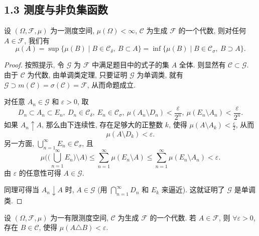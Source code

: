     \subsection{1.3 测度与非负集函数}
        \begin{3}
            设 $(\Omega,\mathcal{F},\mu)$ 为一测度空间, 
            $\mu(\Omega)<\infty$, 
            $\mathcal{C}$ 为生成 $\mathcal{F}$ 的一个代数, 
            则对任何 $A\in\mathcal{F}$, 我们有
            \[
                \mu(A)=\sup\{\mu(B)\mid B\in\mathcal{C}_{\delta},\ B\subset A\}=\inf\{\mu(B)\mid B\in\mathcal{C}_{\sigma},\ B\supset A\}.
            \]
        \end{3}
        \begin{proof}
            按照提示, 令 $\mathcal{G}$ 为 $\mathcal{F}$ 中满足题目中的式子的集 $A$ 全体. 
            则显然有 $\mathcal{C}\subset\mathcal{G}$. 
            由于 $\mathcal{C}$ 为代数, 
            由单调类定理, 
            只要证明 $\mathcal{G}$ 为单调类, 
            就有 $\mathcal{G}\supset m(\mathcal{C})=\sigma(\mathcal{C})=\mathcal{F}$, 
            从而命题成立.

            对任意 $A_n\in\mathcal{G}$ 和 $\varepsilon>0$, 取
            \[
                D_n\subset A_n\subset E_n,\ 
                D_n\in\mathcal{C}_\delta,\ 
                E_n\in\mathcal{C}_\sigma,\ 
                \mu(A_n\setminus D_n)<\frac{\varepsilon}{2^n},\  
                \mu(E_n\setminus A_n)<\frac{\varepsilon}{2^n}.
            \]
            如果 $A_n\uparrow A$, 
            那么由下连续性, 
            存在足够大的正整数 $k$, 
            使得 $\mu(A\setminus A_k)<\displaystyle\frac{\varepsilon}{2}$,  从而
            \[
                \mu(A\setminus D_k)<\varepsilon.
            \]
            另一方面, $\displaystyle\bigcup_{n=1}^\infty E_n\in\mathcal{C}_{\sigma}$, 且
            \[
                \mu\biggl(\big(\bigcup_{n=1}^\infty E_n\big)\setminus A\biggr)\leqslant\sum_{n=1}^\infty \mu(E_n\setminus A)\leqslant\sum_{n=1}^\infty\mu(E_n\setminus A_n)<\varepsilon.
            \]
            由 $\varepsilon$ 的任意性可得 $A\in\mathcal{G}$.

            同理可得当 $A_n\downarrow A$ 时, 
            $A\in\mathcal{G}$ (用 $\displaystyle\bigcap_{n=1}^\infty D_n$ 和 $E_k$ 来逼近). 
            这就证明了 $\mathcal{G}$ 是单调类.
        \end{proof}
        \begin{4}
            设 $(\Omega,\mathcal{F},\mu)$ 为一有限测度空间, 
            $\mathcal{C}$ 为生成 $\mathcal{F}$ 的一个代数. 
            若 $A\in\mathcal{F}$, 
            则 $\forall\varepsilon>0$, 
            存在 $B\in\mathcal{C}$, 
            使得 $\mu(A\triangle B)<\varepsilon$.
        \end{4}
